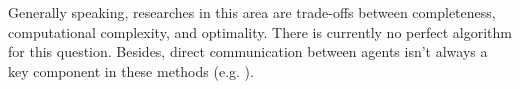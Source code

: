 Generally speaking, researches in this area are trade-offs between completeness, computational complexity, and optimality. There is currently no perfect algorithm for this question.
Besides, direct communication between agents isn't always a key component in these methods (e.g. \cite{D*,RL_3}).
